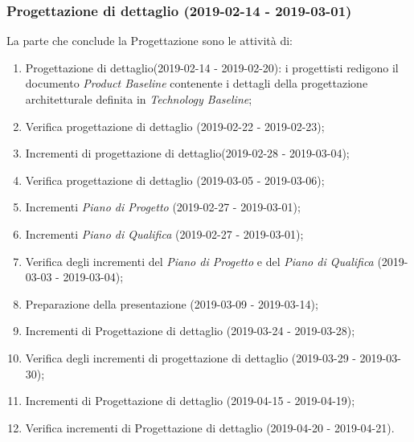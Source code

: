 		\subsubsection{Progettazione di dettaglio (2019-02-14 - 2019-03-01)\\} La parte che conclude la Progettazione sono le attività di:
			\begin{enumerate}[label = 3.3.\arabic*)]
				\item Progettazione di dettaglio(2019-02-14 - 2019-02-20): i progettisti redigono il documento \textit{Product Baseline} contenente i dettagli della progettazione architetturale definita in \textit{Technology Baseline};
				\item Verifica progettazione di dettaglio (2019-02-22 - 2019-02-23);
				\item Incrementi di progettazione di dettaglio(2019-02-28 - 2019-03-04);
				\item Verifica progettazione di dettaglio (2019-03-05 - 2019-03-06);
				\item Incrementi \textit{Piano di Progetto} (2019-02-27 - 2019-03-01);
				\item Incrementi \textit{Piano di Qualifica} (2019-02-27 - 2019-03-01);	
				\item Verifica degli incrementi del \textit{Piano di Progetto} e del \textit{Piano di Qualifica} (2019-03-03 - 2019-03-04);
				\item Preparazione della presentazione (2019-03-09 - 2019-03-14);
				\item Incrementi di Progettazione di dettaglio (2019-03-24 - 2019-03-28);
				\item Verifica degli incrementi di progettazione di dettaglio (2019-03-29 - 2019-03-30);
				\item Incrementi di Progettazione di dettaglio (2019-04-15 - 2019-04-19);
				\item Verifica incrementi di Progettazione di dettaglio (2019-04-20 - 2019-04-21).
			\end{enumerate}
	
